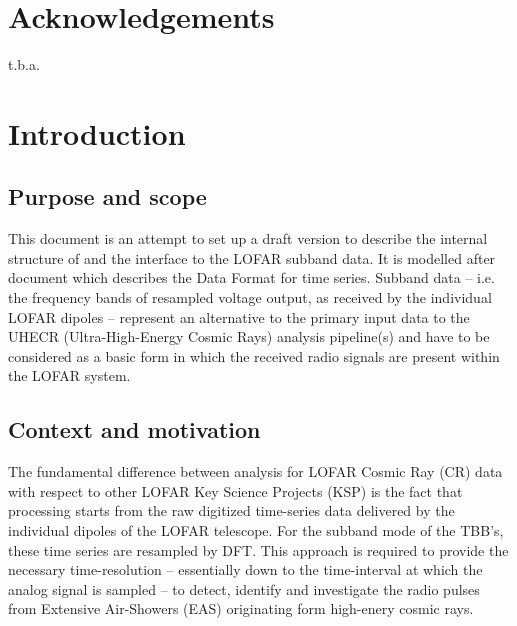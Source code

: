\documentclass[a4paper,10pt,bibtotoc]{scrartcl}
\begin{document}


\section*{Acknowledgements}

t.b.a.

\clearpage


\section{Introduction}
\label{sec:introduction}

\subsection{Purpose and scope}
\label{sec:purpose and scope}

This document is an attempt to set up a draft version to describe the internal structure
of and the interface to the LOFAR subband data. It is modelled after
document \cite{lofar.icd.001} which describes the Data Format for time
series. Subband data -- i.e. the frequency bands of resampled voltage
output, as received by the individual LOFAR dipoles -- represent an
alternative to the primary input data to the UHECR (Ultra-High-Energy
Cosmic Rays) analysis pipeline(s) and have to be considered as a basic
form in which the received radio signals are present within the LOFAR system.

\subsection{Context and motivation}
\label{sec:context and motivation}

The fundamental difference between analysis for LOFAR Cosmic Ray (CR)
data with respect to other LOFAR Key Science Projects (KSP) is the
fact that processing starts from the raw digitized time-series data
delivered by the individual dipoles of the LOFAR telescope. For the
subband mode of the TBB's, these time series are resampled by DFT.
This approach is required to provide the necessary time-resolution --
essentially down to the time-interval at which the analog signal is
sampled -- to detect, identify and investigate the radio pulses from
Extensive Air-Showers (EAS) originating form high-enery cosmic rays. 
\end{document}
